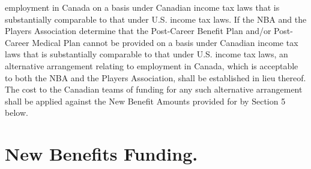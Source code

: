 \documentclass[
]{book}
\begin{document}
\begin{enumerate}
employment in Canada on a basis under Canadian income tax laws that is substantially comparable to that under U.S. income tax laws. If the NBA and the Players Association determine that the Post-Career Benefit Plan and/or Post-Career Medical Plan cannot be provided on a basis under Canadian income tax laws that is substantially comparable to that under U.S. income tax laws, an alternative arrangement relating to employment in Canada, which is acceptable to both the NBA and the Players Association, shall be established in lieu thereof. The cost to the Canadian teams of funding for any such alternative arrangement shall be applied against the New Benefit Amounts provided for by Section 5 below.
\end{enumerate}

\hypertarget{new-benefits-funding.}{%
\section{New Benefits Funding.}\label{new-benefits-funding.}}
\end{document}
